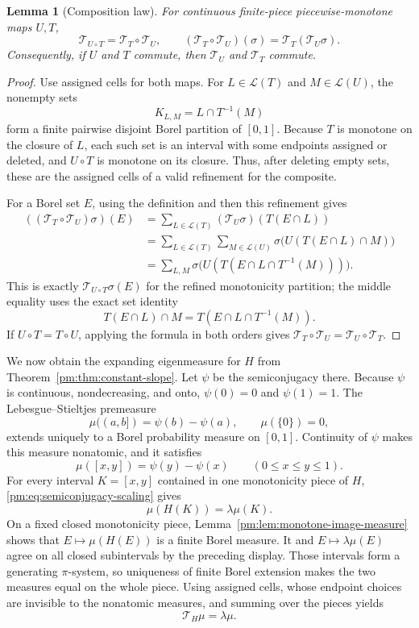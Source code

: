 \documentclass[11pt]{article}
\newtheorem{lemma}[theorem]{Lemma}
\theoremstyle{definition}
\theoremstyle{remark}
\newcommand{\I}{[0,1]}
\newcommand{\T}{\mathcal T}
\newcommand{\Lap}{\mathscr L}
\begin{document}
\begin{lemma}[Composition law]\label{pm:lem:composition}
For continuous finite-piece piecewise-monotone maps $U,T$,
\begin{equation}\label{pm:eq:composition-law}
 \T_{U\circ T}=\T_T\circ\T_U,
 \qquad
 (\T_T\circ\T_U)(\sigma)=\T_T(\T_U\sigma).
\end{equation}
Consequently, if $U$ and $T$ commute, then $\T_U$ and $\T_T$ commute.
\end{lemma}

\begin{proof}
Use assigned cells for both maps.  For $L\in\Lap(T)$ and $M\in\Lap(U)$, the
nonempty sets
\[
 K_{L,M}=L\cap T^{-1}(M)
\]
form a finite pairwise disjoint Borel partition of $\I$.  Because $T$ is
monotone on the closure of $L$, each such set is an interval with some
endpoints assigned or deleted, and $U\circ T$ is monotone on its closure.
Thus, after deleting empty sets, these are the assigned cells of a valid
refinement for the composite.

For a Borel set $E$, using the definition and then this refinement gives
\begin{align*}
 ((\T_T\circ\T_U)\sigma)(E)
 &=\sum_{L\in\Lap(T)}(\T_U\sigma)(T(E\cap L))\\
 &=\sum_{L\in\Lap(T)}\sum_{M\in\Lap(U)}
   \sigma\bigl(U(T(E\cap L)\cap M)\bigr)\\
 &=\sum_{L,M}
   \sigma\bigl(U(T(E\cap L\cap T^{-1}(M)))\bigr).
\end{align*}
This is exactly $\T_{U\circ T}\sigma(E)$ for the refined monotonicity
partition; the middle equality uses the exact set identity
\[
 T(E\cap L)\cap M=T(E\cap L\cap T^{-1}(M)).
\]
If $U\circ T=T\circ U$, applying the formula in both orders gives
$\T_T\circ\T_U=\T_U\circ\T_T$.
\end{proof}

We now obtain the expanding eigenmeasure for $H$ from
Theorem~\ref{pm:thm:constant-slope}.  Let $\psi$ be the semiconjugacy there.
Because $\psi$ is continuous, nondecreasing, and onto,
$\psi(0)=0$ and $\psi(1)=1$.  The Lebesgue--Stieltjes premeasure
\[
 \mu((a,b])=\psi(b)-\psi(a),\qquad \mu(\{0\})=0,
\]
extends uniquely to a Borel probability measure on $\I$.  Continuity of
$\psi$ makes this measure nonatomic, and it satisfies
\begin{equation}\label{pm:eq:mu-from-psi}
 \mu([x,y])=\psi(y)-\psi(x)\qquad(0\le x\le y\le1).
\end{equation}
For every interval $K=[x,y]$ contained in one monotonicity piece of $H$,
\eqref{pm:eq:semiconjugacy-scaling} gives
\[
 \mu(H(K))=\lambda\mu(K).
\]
On a fixed closed monotonicity piece, Lemma~\ref{pm:lem:monotone-image-measure}
shows that $E\mapsto\mu(H(E))$ is a finite Borel measure.  It and
$E\mapsto\lambda\mu(E)$ agree on all closed subintervals by the preceding
display.  Those intervals form a generating $\pi$-system, so uniqueness of
finite Borel extension makes the two measures equal on the whole piece.
Using assigned cells, whose endpoint choices are invisible to the
nonatomic measures, and summing over the pieces yields
\begin{equation}\label{pm:eq:H-eigenmeasure}
 \T_H\mu=\lambda\mu.
\end{equation}
\end{document}

